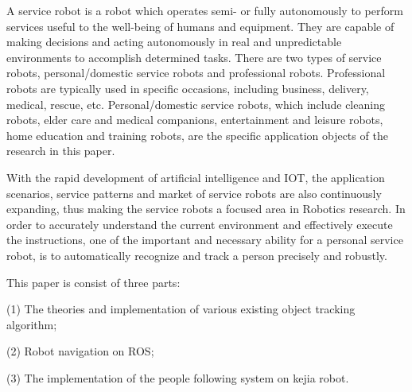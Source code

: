 \begin{enabstract}
  A service robot is a robot which operates semi- or fully autonomously to perform services useful to the well-being of humans and equipment. They are capable of making decisions and acting autonomously in real and unpredictable environments to accomplish determined tasks.  There are two types of service robots, personal/domestic service robots and professional robots. Professional robots are typically used in specific occasions, including business, delivery, medical, rescue, etc. Personal/domestic service robots, which include cleaning robots, elder care and medical companions, entertainment and leisure robots, home education and training robots, are the specific application objects of the research in this paper.

  With the rapid development of artificial intelligence and IOT, the application scenarios, service patterns and market of service robots are also continuously expanding, thus making the service robots a focused area in Robotics research. In order to accurately understand the current environment and effectively execute the instructions, one of the important and necessary ability for a personal service robot, is to automatically recognize and track a person precisely and robustly.

  This paper is consist of three parts:

  (1) The theories and implementation of various existing object tracking algorithm;

  (2) Robot navigation on ROS;

  (3) The implementation of the people following system on kejia robot.

\end{enabstract}